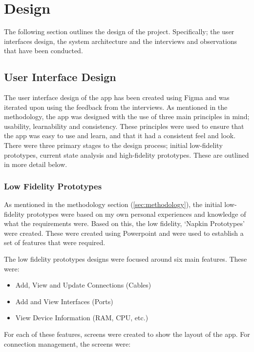 \documentclass [11pt,a4paper]{article}
\begin{document}
\section{Design}
\label{sec:design}
The following section outlines the design of the project. Specifically; the user interfaces design, the system architecture and the interviews and observations that have been conducted.

\subsection{User Interface Design}
\label{sec:ui_design}
The user interface design of the app has been created using Figma and was iterated upon using the feedback from the interviews. As mentioned in the methodology, the app was designed with the use of three main principles in mind; usability, learnability and consistency. These principles were used to ensure that the app was easy to use and learn, and that it had a consistent feel and look. There were three primary stages to the design process; initial low-fidelity prototypes, current state analysis and high-fidelity prototypes. These are outlined in more detail below. 

\subsubsection{Low Fidelity Prototypes}
\label{sec:ui_design_initial_prototypes}
As mentioned in the methodology section (\ref{sec:methodology}), the initial low-fidelity prototypes were based on my own personal experiences and knowledge of what the requirements were. Based on this, the low fidelity, `Napkin Prototypes' were created. These were created using Powerpoint and were used to establish a set of features that were required. 

The low fidelity prototypes designs were focused around six main features. These were:
\begin{itemize}
    \item Add, View and Update Connections (Cables)
    \item Add and View Interfaces (Ports)
    \item View Device Information (RAM, CPU, etc.)
\end{itemize}

For each of these features, screens were created to show the layout of the app. For connection management, the screens were:
\end{document}
